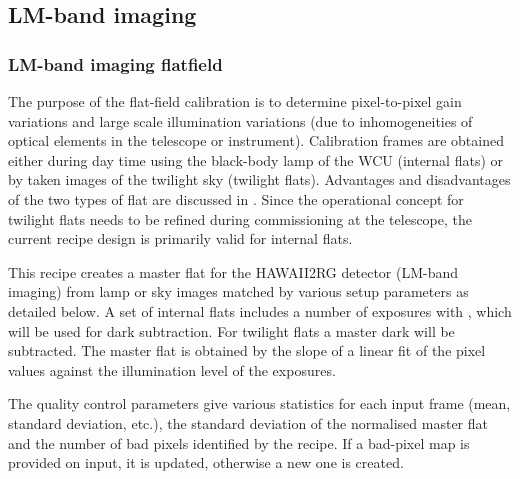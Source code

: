 
\subsection{LM-band imaging}
\label{ssec:recipes_img_lm}

\subsubsection{LM-band imaging flatfield}
\label{lm_img_flatfield}
\label{rec:lm_img_flatfield}
\label{sssec:lm_img_flatfield}
\label{metis_lm_img_flat}
\label{rec:metis_lm_img_flat}
\label{sssec:metis_lm_img_flat}

The purpose of the flat-field calibration is to determine
pixel-to-pixel gain variations and large scale illumination variations
(due to inhomogeneities of optical elements in the telescope or
instrument). Calibration frames are obtained either during day time
using the black-body lamp of the \ac{WCU} (internal flats) or by taken
images of the twilight sky (twilight flats). Advantages and
disadvantages of the two types of flat are discussed in
\cite{METIS-calibration_plan}. Since the operational concept for
twilight flats needs to be refined during commissioning at the
telescope, the current recipe design is primarily valid for internal
flats.

This recipe creates a master flat for the HAWAII2RG detector (LM-band
imaging) from lamp or sky images matched by various setup parameters
as detailed below.  A set of internal flats includes a number of
exposures with , which will be used for dark
subtraction. For twilight flats a master dark will be subtracted. The
master flat is obtained by the slope of a linear fit of the pixel
values against the illumination level of the exposures.

The quality control parameters give various statistics for each input
frame (mean, standard deviation, etc.), the standard deviation of the
normalised master flat and the number of bad pixels identified by the
recipe. If a bad-pixel map is provided on input, it is updated,
otherwise a new one is created.


